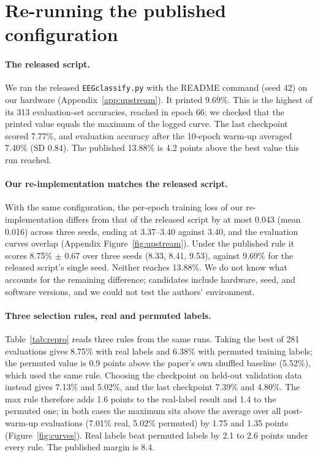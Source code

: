 \section{Re-running the published configuration}
\label{sec:results}

\paragraph{The released script.}
We ran the released \texttt{EEGclassify.py} with the README command (seed 42) on our hardware
(Appendix~\ref{app:upstream}). It printed 9.69\%. This is the highest of its 313 evaluation-set
accuracies, reached in epoch 66; we checked that the printed value equals the maximum of the logged
curve. The last checkpoint scored 7.77\%, and evaluation accuracy after the 10-epoch warm-up averaged
7.40\% (SD 0.84). The published 13.88\% is 4.2 points above the best value this run reached.

\paragraph{Our re-implementation matches the released script.}
With the same configuration, the per-epoch training loss of our re-implementation differs from
that of the released script by at most 0.043 (mean 0.016) across three seeds, ending at 3.37--3.40 against
3.40, and the evaluation curves overlap (Appendix Figure~\ref{fig:upstream}). Under the published rule it scores 8.75\% $\pm$ 0.67 over three
seeds (8.33, 8.41, 9.53), against 9.69\% for the released script's single seed. Neither reaches
13.88\%. We do not know what accounts for the remaining difference; candidates include hardware,
seed, and software versions, and we could not test the authors' environment.

\paragraph{Three selection rules, real and permuted labels.}
Table~\ref{tab:repro} reads three rules from the same runs. Taking the best of 281 evaluations gives
8.75\% with real labels and 6.38\% with permuted training labels; the permuted value is 0.9 points
above the paper's own shuffled baseline (5.52\%), which used the same rule. Choosing the checkpoint on
held-out validation data instead gives 7.13\% and 5.02\%, and the last checkpoint 7.39\% and 4.80\%.
The max rule therefore adds 1.6 points to the real-label result and 1.4 to the permuted one; in both
cases the maximum sits above the average over all post-warm-up evaluations (7.01\% real, 5.02\%
permuted) by 1.75 and 1.35 points (Figure~\ref{fig:curves}). Real labels beat permuted labels by 2.1
to 2.6 points under every rule. The published margin is 8.4.

